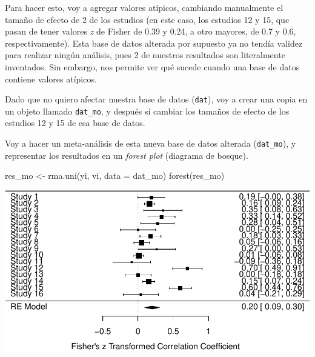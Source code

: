 \documentclass[
  bookmarksnumbered]{article}
\newenvironment{Shaded}{\begin{snugshade}}{\end{snugshade}}
\newcommand{\AttributeTok}[1]{\textcolor[rgb]{0.00,0.34,0.68}{#1}}
\newcommand{\DecValTok}[1]{\textcolor[rgb]{0.69,0.50,0.00}{#1}}
\newcommand{\FloatTok}[1]{\textcolor[rgb]{0.69,0.50,0.00}{#1}}
\newcommand{\FunctionTok}[1]{\textcolor[rgb]{0.39,0.29,0.61}{#1}}
\newcommand{\NormalTok}[1]{\textcolor[rgb]{0.12,0.11,0.11}{#1}}
\newcommand{\OtherTok}[1]{\textcolor[rgb]{0.00,0.43,0.16}{#1}}
\newcommand{\SpecialCharTok}[1]{\textcolor[rgb]{0.24,0.68,0.91}{#1}}
\begin{document}
Para hacer esto, voy a agregar valores atípicos, cambiando manualmente el tamaño de efecto de 2 de los estudios (en este caso, los estudios 12 y 15, que pasan de tener valores \emph{z} de Fisher de 0.39 y 0.24, a otro mayores, de 0.7 y 0.6, respectivamente). Esta base de datos alterada por supuesto ya no tendía validez para realizar ningún análisis, pues 2 de nuestros resultados son literalmente inventados. Sin embargo, nos permite ver qué sucede cuando una base de datos contiene valores atípicos.

Dado que no quiero afectar nuestra base de datos (\texttt{dat}), voy a crear una copia en un objeto llamado \texttt{dat\_mo}, y después sí cambiar los tamaños de efecto de los estudios 12 y 15 de esa base de datos.

\begin{Shaded}
\end{Shaded}

Voy a hacer un meta-análisis de esta nueva base de datos alterada (\texttt{dat\_mo}), y representar los resultados en un \emph{forest plot} (diagrama de bosque).

\begin{Shaded}
\begin{Highlighting}[]
\NormalTok{res\_mo }\OtherTok{\textless{}{-}} \FunctionTok{rma.uni}\NormalTok{(yi, vi, }\AttributeTok{data =}\NormalTok{ dat\_mo) }
\FunctionTok{forest}\NormalTok{(res\_mo)}
\end{Highlighting}
\end{Shaded}

\includegraphics{Meta-analysis_files/figure-latex/unnamed-chunk-30-1.pdf}
\end{document}

